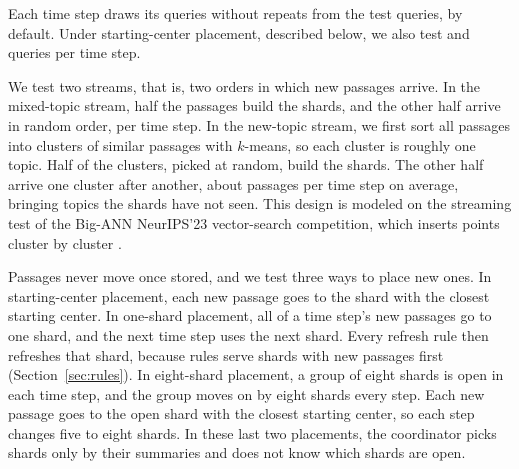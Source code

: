 Each time step draws its queries without repeats from the \RNumPlainTestQueries{} test queries, \RNumPlainQueriesDefault{} by default.
Under starting-center placement, described below, we also test \RNumPlainQueriesLow{} and \RNumPlainQueriesHigh{} queries per time step.

We test two streams, that is, two orders in which new passages arrive.
In the mixed-topic stream, half the passages build the shards, and the other half arrive in random order, \RNumSteadyEpochInsertVecs{} per time step.
In the new-topic stream, we first sort all passages into \RNumPlainTopicClusters{} clusters of similar passages with $k$-means, so each cluster is roughly one topic.
Half of the clusters, picked at random, build the shards.
The other half arrive one cluster after another, about \RNumPlainNewTopicStepVecs{} passages per time step on average, bringing topics the shards have not seen.
This design is modeled on the streaming test of the Big-ANN NeurIPS'23 vector-search competition, which inserts points cluster by cluster \cite{simhadri2024bigann}.

Passages never move once stored, and we test three ways to place new ones.
In starting-center placement, each new passage goes to the shard with the closest starting center.
In one-shard placement, all of a time step's new passages go to one shard, and the next time step uses the next shard.
Every refresh rule then refreshes that shard, because rules serve shards with new passages first (Section~\ref{sec:rules}).
In eight-shard placement, a group of eight shards is open in each time step, and the group moves on by eight shards every step.
Each new passage goes to the open shard with the closest starting center, so each step changes five to eight shards.
In these last two placements, the coordinator picks shards only by their summaries and does not know which shards are open.

